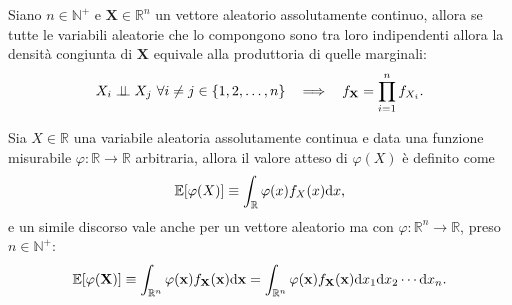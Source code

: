         \begin{prt}
            \label{prtDensitàCongiuntaIndipendente}
            Siano \(n\in\mathbb N^+\) e \(\mathbf X\in\mathbb R^n\) un vettore aleatorio assolutamente continuo, allora se tutte le variabili aleatorie che lo compongono sono tra loro indipendenti allora la densità congiunta di \(\mathbf X\) equivale alla produttoria di quelle marginali:
            \[
                X_i\independent X_j
                \ \forall i\neq j\in\{1,2,\ldots,n\}
                \ \ \implies\ \ 
                f_{\mathbf X}=\prod_{i=1}^nf_{X_i}.
            \]
        \end{prt}

        \begin{dfn}
            \label{defValoreAtteso}
            Sia \(X\in\mathbb R\) una variabile aleatoria assolutamente continua e data una funzione misurabile \(\varphi\colon\mathbb R\to\mathbb R\) arbitraria, allora il valore atteso di \(\varphi(X)\) è definito come
            \[
                \mathbb E[\varphi(X)]\equiv\int_{\mathbb R}\varphi(x)f_X(x)\mathrm{d} x,
            \]
            e un simile discorso vale anche per un vettore aleatorio ma con \(\varphi\colon\mathbb R^n\to\mathbb R\), preso \(n\in\mathbb N^+\):
            \[
                \mathbb E[\varphi(\mathbf X)]
                \equiv\int_{\mathbb R^n}\varphi(\mathbf x)f_{\mathbf X}(\mathbf x)\mathrm{d}\mathbf x
                =\int_{\mathbb R^n}\varphi(\mathbf x)f_{\mathbf X}(\mathbf x)\mathrm{d} x_1\mathrm{d} x_2\cdots\mathrm{d} x_n.
            \]
        \end{dfn}

